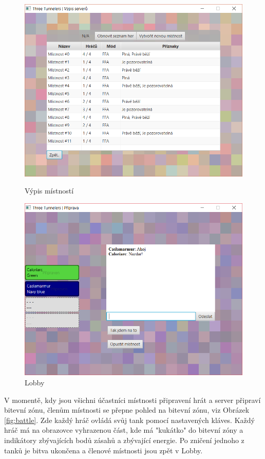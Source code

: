\documentclass[12pt,a4paper]{article}
\begin{document}
\begin{figure}[h]
    \centering
    \begin{minipage}{0.45\textwidth}
        \includegraphics[width=1\textwidth]{img/03_rooms_list.png}
    	\caption{Výpis místností}
		\label{fig:rooms_list}
    \end{minipage}\hfill
    \begin{minipage}{0.45\textwidth}
        \includegraphics[width=1\textwidth]{img/04_lobby.png}
        \caption{Lobby}
		\label{fig:lobby}
    \end{minipage}
\end{figure}
V momentě, kdy jsou všichni účastníci místnosti připravení hrát a server připraví bitevní zónu, členům místnosti se přepne pohled na bitevní zónu, viz Obrázek \ref{fig:battle}. Zde každý hráč ovládá svůj tank pomocí nastavených kláves. Každý hráč má na obrazovce vyhrazenou část, kde má "kukátko" do bitevní zóny a indikátory zbývajících bodů zásahů a zbývající energie. Po zničení jednoho z tanků je bitva ukončena a členové místnosti jsou zpět v Lobby.
\end{document}
